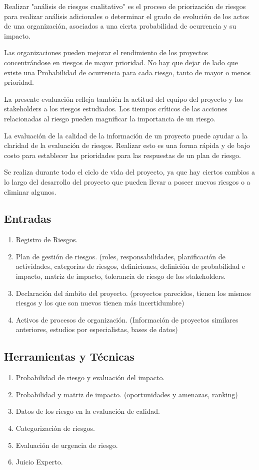 Realizar "análisis de riesgos cualitativo" es el proceso de
priorización de riesgos para realizar análisis adicionales o
determinar el grado de evolución de los actos de una organización,
asociados a una cierta probabilidad de ocurrencia y su impacto.

Las organizaciones pueden mejorar el rendimiento de los proyectos
concentrándose en riesgos de mayor prioridad.
No hay que dejar de lado que existe una Probabilidad de ocurrencia
para cada riesgo, tanto de mayor o menos prioridad.

La presente evaluación refleja también la actitud del equipo del proyecto y
los stakeholders a los riesgos estudiados.
Los tiempos críticos de las acciones relacionadas al riesgo pueden
magnificar la importancia de un riesgo.

La evaluación de la calidad de la información de un proyecto
puede ayudar a la claridad de la evaluación de riesgos.
Realizar esto es una forma rápida y de bajo costo para establecer
las prioridades para las respuestas de un plan de riesgo.

Se realiza durante todo el ciclo de vida del proyecto,
ya que hay ciertos cambios a lo largo del desarrollo del proyecto
que pueden llevar a poseer nuevos riesgos o a eliminar algunos.

\subsection{Entradas}
\begin{enumerate}
	\item Registro de Riesgos.
	\item Plan de gestión de riesgos. (roles, responsabilidades, planificación
		de actividades, categorías de riesgos, definiciones, definición de probabilidad
		e impacto, matriz de impacto, tolerancia de riesgo de los stakeholders.
	\item Declaración del ámbito del proyecto. (proyectos parecidos, tienen los mismos
		riesgos y los que son nuevos tienen más incertidumbre)
	\item Activos de procesos de organización. (Información de proyectos similares
		anteriores, estudios por especialistas, bases de datos)
\end{enumerate}

\subsection{Herramientas y Técnicas}
\begin{enumerate}
	\item Probabilidad de riesgo y evaluación del impacto.
	\item Probabilidad y matriz de impacto. (oportunidades y amenazas, ranking)
	\item Datos de los riesgo en la evaluación de calidad.
	\item Categorización de riesgos.
	\item Evaluación de urgencia de riesgo.
	\item Juicio Experto.
\end{enumerate}


